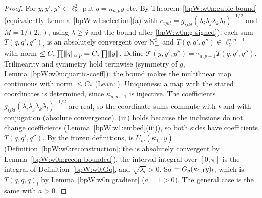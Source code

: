 \begin{proof}
\label{stepW:w1:tricoord}
For $y,y',y''\in\ell^2_{\mathbb K}$ put $q=\kappa_{a,p}y$ etc. By Theorem~\ref{bpW:w0n:cubic-bound} (equivalently
Lemma~\ref{bpW:w1:selection}(a) with $c_{ijkl}=g_{ijkl}(\lambda_i\lambda_j\lambda_k\lambda_l)^{-1/2}$ and $M=1/(2\pi)$,
using $\lambda\ge j$ and the bound after \eqref{bpW:w0n:g-signed}), each sum
$T(q,q',q'')_l$ is an absolutely convergent  over $\mathbb{N}_+^3$ and $T(q,q',q'')\in\ell^{a,p+1}_{\mathbb K}$
with norm $\le C_*\prod\lVert q\rVert_{a,p}=C_*\prod\lVert y\rVert$. Define $\mathcal T(y,y',y'')=\tau_{a,p+1}T(q,q',q'')$.
\label{stepW:w1:tricont}
Trilinearity and symmetry hold termwise (symmetry of $g$, Lemma~\ref{bpW:w0n:quartic-coeff}); the bound makes the
multilinear map continuous with norm $\le C_*$ (Lean: ). Uniqueness: a map with the
stated coordinates is determined, since $\kappa_{a,p+1}$ is injective.
\label{stepW:w1:trireal}
The coefficients $g_{ijkl}(\lambda_i\lambda_j\lambda_k\lambda_l)^{-1/2}$ are real, so the coordinate sums commute with
$\iota$ and with conjugation (absolute convergence). (iii) holds because the inclusions do not change coefficients
(Lemma~\ref{bpW:w1:embed}(iii)), so both sides have coefficients $T(q,q',q'')$.
\label{stepW:w1:trifrozen}
By the frozen definitions,  is $U_m(\kappa_{1,1}y)$ (Definition~\ref{bpW:w0:reconstruction}; the
 is absolutely convergent by Lemma~\ref{bpW:w0n:recon-bounded}), the interval integral over $[0,\pi]$ is the
integral of Definition~\ref{bpW:w0:Gq}, and $\sqrt{\lambda_l}>0$. So  $=G_q(\kappa_{1,1}y)_l$,
which is $T(q,q,q)_l$ by Lemma~\ref{bpW:w0n:gradient} ($a=1>0$). The general case is the same with $a>0$.
\end{proof}

